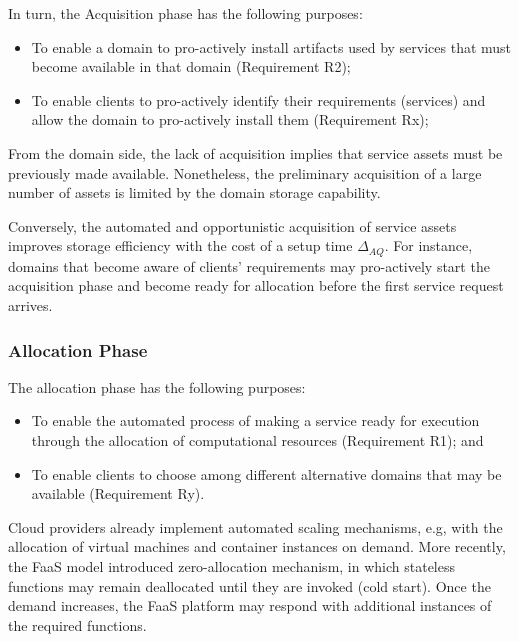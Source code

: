 In turn, the Acquisition phase has the following purposes:

\begin{itemize}

	\item To enable a domain to pro-actively install artifacts used by services that must become available in that domain (Requirement R2);
	
	\item To enable clients to pro-actively identify their requirements (services) and allow the domain to pro-actively install them (Requirement Rx);

\end{itemize}

From the domain side, the lack of acquisition implies that service assets must be previously made available. Nonetheless, the preliminary acquisition of a large number of assets is limited by the domain storage capability. 

Conversely, the automated and opportunistic acquisition of service assets improves storage efficiency with the cost of a setup time $\Delta_{AQ}$. For instance, domains that become aware of clients' requirements may pro-actively start the acquisition phase and become ready for allocation before the first service request arrives.


\subsubsection{Allocation Phase}\label{sec:A3-E-allocation}

The allocation phase has the following purposes:

\begin{itemize}

\item To enable the automated process of making a service ready for execution through the allocation of computational resources (Requirement R1); and

\item To enable clients to choose among different alternative domains that may be available (Requirement Ry).

\end{itemize}
 
Cloud providers already implement automated scaling mechanisms, e.g, with the allocation of virtual machines and container instances on demand. More recently, the FaaS model introduced zero-allocation mechanism, in which stateless functions may remain deallocated until they are invoked (cold start). Once the demand increases, the FaaS platform may respond with additional instances of the required functions.


